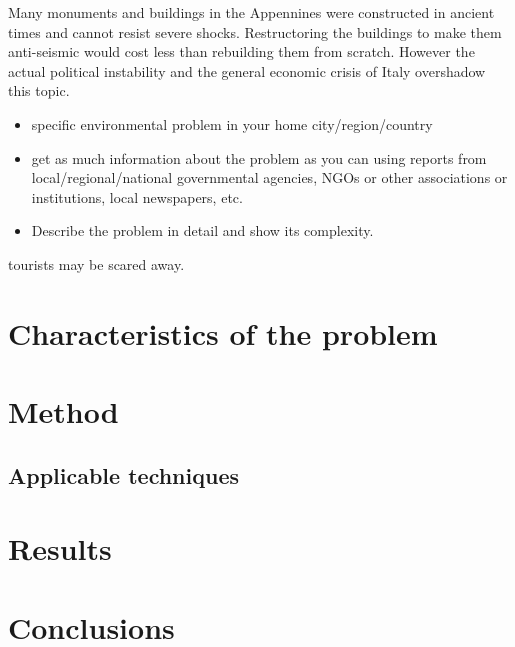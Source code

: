 \documentclass[10pt,a4paper]{article}
\begin{document}
Many monuments and buildings in the Appennines were constructed in ancient times and cannot resist severe shocks. Restructoring the buildings to make them anti-seismic would cost less than rebuilding them from scratch. However the actual political instability and the general economic crisis of Italy  overshadow this topic.



\begin{itemize}
\item specific environmental problem in your home city/region/country
\item get as much information about the problem as you can using reports from local/regional/national governmental agencies, NGOs or other associations or institutions, local newspapers, etc.
\item Describe the problem in detail and show its complexity.
\end{itemize}

tourists may be scared away.


\section{Characteristics of the problem}\label{sec:features}

\section{Method}\label{sec:method}

\subsection{Applicable techniques}

\section{Results}\label{sec:results}

\section{Conclusions}\label{sec:conclusions}
\end{document}
